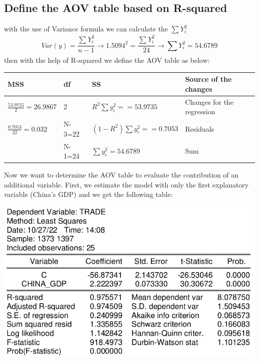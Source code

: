 \documentclass[12pt, letterpaper, twoside]{article}
\begin{document}
\subsection{Define the AOV table based on R-squared}
with the use of Variance formula we can calculate the \(\sum_{}^{}Y_{i}^2\)
\[Var(y)=\frac{\sum_{}^{}Y_{i}^2}{n-1}\to1.5094^2=\frac{\sum_{}^{}Y_{i}^2}{24}\to\sum_{}^{}Y_{i}^2=54.6789\]
then with the help of R-squared we define the AOV table as below:
\begin{table}[ht]
\centering
\begin{tabular}{|l|l|l|l|}
\hline
MSS                                          & df     & SS                                                                                                & Source of the changes      \\ \hline {$\displaystyle\frac{53.9735}{2}=26.9867$} & 2      & {$\displaystyle R^2\sum y_{i}^2==53.9735$}        & Changes for the regression \\ \hline
{$\displaystyle \frac{0.7053}{22}=0.032$}   & N-3=22 & {$\displaystyle (1-R^2)\sum y_{i}^2==0.7053$} & Residuals                  \\ \hline
                                             & N-1=24 & {$\displaystyle \sum y_{i}^2=54.6789$}                                            & Sum                        \\ \hline
\end{tabular}
\end{table}


Now we want to determine the AOV table to evaluate the contribution of an additional variable. First, we estimate the model with only the first explanatory variable (China's GDP) and we get the following table:

    \includegraphics[width=.6\textwidth,height=.6\textwidth,keepaspectratio,center]{7.png}
\end{document}
